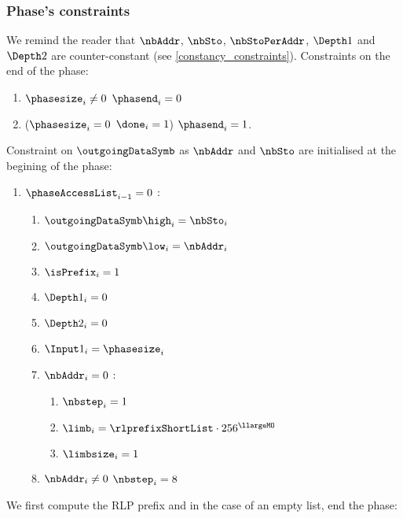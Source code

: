\subsubsection{Phase's constraints}
We remind the reader that $\nbAddr$, $\nbSto$, $\nbStoPerAddr$, $\Depth1$ and $\Depth2$ are counter-constant (see \ref{constancy_constraints}).
\newline
Constraints on the end of the phase:
\begin{enumerate}
	\item \If $\phasesize_{i} \neq 0$ \Then $\phasend_{i}=0$
	\item\label{constraint: end of access set phase} \If ($\phasesize_{i}=0$ \et $\done_{i}=1$) \Then $\phasend_{i}=1$.
\end{enumerate}
Constraint on $\outgoingDataSymb$ as $\nbAddr$ and $\nbSto$ are initialised at the begining of the phase:
\begin{enumerate}[resume]
    \item \If $\phaseAccessList_{i-1}=0$ \Then:
    \begin{enumerate}
        \item $\outgoingDataSymb\high_{i}=\nbSto_{i}$
        \item $\outgoingDataSymb\low_{i}=\nbAddr_{i}$
		\item $\isPrefix_{i}=1$
		\item $\Depth1_{i} = 0$
		\item $\Depth2_{i} = 0$
		\item $\Input1_{i} = \phasesize_{i}$
		\item \If $\nbAddr_{i}=0$ \Then: 
		\begin{enumerate}
			\item $\nbstep_{i}=1$
			\item $\limb_{i}=\rlprefixShortList \cdot 256 ^{\llargeMO}$
			\item $\limbsize_{i}=1$
		\end{enumerate}
		\item \If $\nbAddr_{i} \neq 0$ \Then $\nbstep_{i}=8$
    \end{enumerate} 
\end{enumerate}
We first compute the RLP prefix and in the case of an empty list, end the phase:
